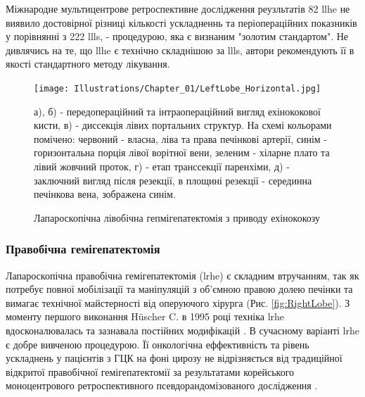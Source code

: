 Міжнародне мультицентрове ретроспективне дослідження реузльтатів 82 \acrshort{llhe} \cite{Belli2013a} не виявило достовірної різниці кількості ускладненнь та періопераційних показників у порівнянні з 222 \acrshort{llls}, - процедурою, яка є визнаним "золотим стандартом". Не дивлячись на те, що \acrshort{llhe} є технічно складнішою за \acrshort{llls}, автори рекомендують її в якості стандартного методу лікування. 

\begin{figure}[h]
\caption{Лапароскопічна лівобічна гепмігепатектомія з приводу ехінококозу}

\texttt{[image: Illustrations/Chapter\_01/LeftLobe\_Horizontal.jpg]}
\label{fig:LeftLobe}

\medskip
\small
 а), б) - передопераційний та інтраопераційний вигляд ехінококової кисти, в) - диссекція лівих портальних структур. На схемі кольорами помічено: червоний - власна, ліва та права печінкові артерії, синім - горизонтальна порція лівої ворітної вени, зеленим - хіларне плато та лівий жовчний проток, г) - етап транссекції паренхіми, д) - заключний вигляд після резекції, в площині резекції - серединна печінкова вена, зображена синім.

\end{figure}

\subsubsection{Правобічна гемігепатектомія}

Лапароскопічна правобічна гемігепатектомія (\acrshort{lrhe}) є складним втручанням, так як потребує повної мобілізації та маніпуляцій з об'ємною правою долею печінки та вимагає технічної майстерності від оперуючого хірурга (Рис. \ref{fig:RightLobe}). З моменту першого виконання Hüscher C. в 1995 році \cite{Huscher1997} техніка \acrshort{lrhe} вдосконалювалась та зазнавала постійних модифікацій \cite{Gayet2007, Dagher2008, Homma2019, Kim2017a}. В сучасному варіанті \acrshort{lrhe} є добре вивченою процедурою. Її онкологічна еффективність та рівень ускладнень у пацієнтів з ГЦК на фоні цирозу не відрізняється від традиційної відкритої правобічної гемігепатектомії за результатами корейського моноцентрового ретроспективного псевдорандомізованого дослідження \cite{Yoon2017b}. 

